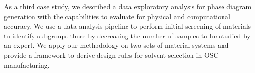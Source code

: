 As a third case study, we described a data exploratory analysis for phase diagram generation with the capabilities to evaluate for physical and computational accuracy. 
We use a data-analysis pipeline to perform initial screening of materials to identify subgroups there by decreasing the number of samples to be studied by an expert.
We apply our methodology on two sets of material systems and provide a framework to derive design rules for solvent selection in OSC manufacturing.
